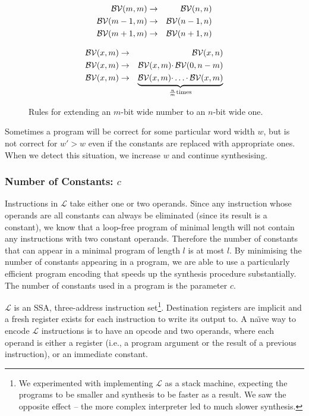\begin{figure}

\centering
\begin{minipage}[t]{.45\textwidth}
\begin{eqnarray*}
 \mathcal{BV}(m, m) & \rightarrow & \mathcal{BV}(n, n) \\
 \mathcal{BV}(m-1, m) & \rightarrow & \mathcal{BV}(n-1, n) \\
 \mathcal{BV}(m+1, m) & \rightarrow & \mathcal{BV}(n+1, n)
\end{eqnarray*}
\end{minipage}
\begin{minipage}[t]{.45\textwidth}
\begin{eqnarray*}
 \mathcal{BV}(x, m) & \rightarrow & \mathcal{BV}(x, n) \\
 \mathcal{BV}(x, m) & \rightarrow & \mathcal{BV}(x, m) \cdotp \mathcal{BV}(0, n - m) \\
 \mathcal{BV}(x, m) & \rightarrow & \underbrace{\mathcal{BV}(x, m) \cdotp \ldots \cdotp \mathcal{BV}(x, m)}_{\frac{n}{m} \mathrm{ times}}
\end{eqnarray*}
\end{minipage}

\caption{Rules for extending
an $m$-bit wide number to an $n$-bit wide one.
 \label{fig:generalize}}
\end{figure}

Sometimes a program will be correct for some particular word width $w$, but is
not correct for $w' > w$ even if the constants are replaced with appropriate ones.
When we detect this situation, we increase $w$ and continue synthesising.

\subsubsection{Number of Constants: $c$}
Instructions in $\mathcal{L}$ take either one or two operands.
Since any instruction whose operands are all constants can always be
eliminated (since its result is a constant), we know that a loop-free program
of minimal length will not contain any instructions with two constant
operands.  Therefore the number of constants that can appear in
a minimal program of length $l$ is at most $l$.  By minimising the number
of constants appearing in a program, we are able to use a particularly
efficient program encoding that speeds up the synthesis procedure
substantially.  The number of constants used in a program is the parameter $c$.

$\mathcal{L}$ is an SSA, three-address instruction set\footnote{
We experimented with implementing $\mathcal{L}$ as a stack machine, expecting
the programs to be smaller and synthesis to be faster as a result.  We saw
the opposite effect -- the more complex interpreter led to much slower synthesis.
}.  Destination registers
are implicit and a fresh register exists for each instruction to write its
output to.  A na\"{\i}ve way to encode $\mathcal{L}$ instructions is to have an
opcode and two operands, where each operand is either a register (i.e., a program argument
or the result of a previous instruction), or an immediate constant.

